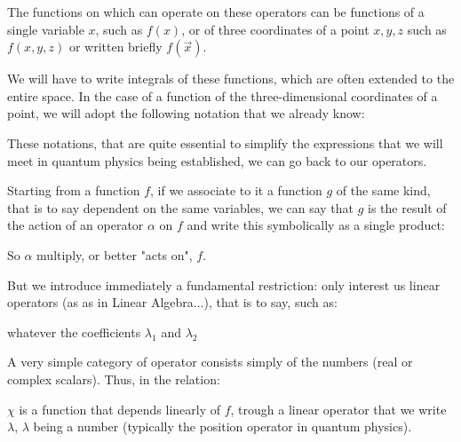 	The functions on which can operate on these operators can be functions of a single variable $x$, such as $f (x)$, or of three coordinates of a point $x, y, z$ such as $f (x, y, z)$ or written briefly $f(\vec{x})$.

	We will have to write integrals of these functions, which are often extended to the entire space. In the case of a function of the three-dimensional coordinates of a point, we will adopt the following notation that we already know:
	
	These notations, that are quite essential to simplify the expressions that we will meet in quantum physics being established, we can go back to our operators.

	Starting from a function $f$, if we associate to it a function $g$ of the same kind, that is to say dependent on the same variables, we can say that $g$ is the result of the action of an operator $\alpha$ on $f$ and write this symbolically as a single product:
	
	So $\alpha$ multiply, or better "acts on", $f$.
	
	But we introduce immediately a fundamental restriction: only interest us linear operators (as as in Linear Algebra...), that is to say, such as:
	
	whatever the coefficients $\lambda_1$ and $\lambda_2$

	A very simple category of operator consists simply of the numbers (real or complex scalars). Thus, in the relation:
	
	$\chi$ is a function that depends linearly of $f$, trough a linear operator that we write $\lambda$, $\lambda$ being a number (typically the position operator in quantum physics).

